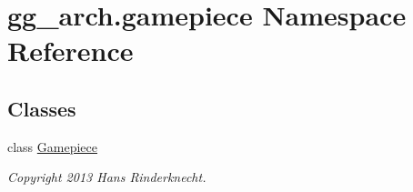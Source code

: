 \hypertarget{namespacegg__arch_1_1gamepiece}{\section{gg\-\_\-arch.\-gamepiece Namespace Reference}
\label{namespacegg__arch_1_1gamepiece}
}
\subsection*{Classes}
\begin{DoxyCompactItemize}
\item 
class \hyperlink{classgg__arch_1_1gamepiece_1_1_gamepiece}{Gamepiece}
\begin{DoxyCompactList}\small\item\em Copyright 2013 Hans Rinderknecht. \end{DoxyCompactList}\end{DoxyCompactItemize}

